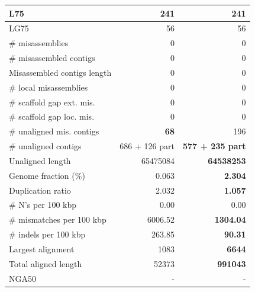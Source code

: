 \documentclass[12pt,a4paper]{article}
\begin{document}
\begin{table}[ht]
\begin{center}
\begin{tabular}{|l*{2}{|r}|}
L75 & 241 & 241 \\ \hline
LG75 & 56 & 56 \\ \hline
\# misassemblies & 0 & 0 \\ \hline
\# misassembled contigs & 0 & 0 \\ \hline
Misassembled contigs length & 0 & 0 \\ \hline
\# local misassemblies & 0 & 0 \\ \hline
\# scaffold gap ext. mis. & 0 & 0 \\ \hline
\# scaffold gap loc. mis. & 0 & 0 \\ \hline
\# unaligned mis. contigs & {\bf 68} & 196 \\ \hline
\# unaligned contigs & 686 + 126 part & {\bf 577 + 235 part} \\ \hline
Unaligned length & 65475084 & {\bf 64538253} \\ \hline
Genome fraction (\%) & 0.063 & {\bf 2.304} \\ \hline
Duplication ratio & 2.032 & {\bf 1.057} \\ \hline
\# N's per 100 kbp & 0.00 & 0.00 \\ \hline
\# mismatches per 100 kbp & 6006.52 & {\bf 1304.04} \\ \hline
\# indels per 100 kbp & 263.85 & {\bf 90.31} \\ \hline
Largest alignment & 1083 & {\bf 6644} \\ \hline
Total aligned length & 52373 & {\bf 991043} \\ \hline
NGA50 & - & - \\ \hline
\end{tabular}
\end{center}
\end{table}
\end{document}
